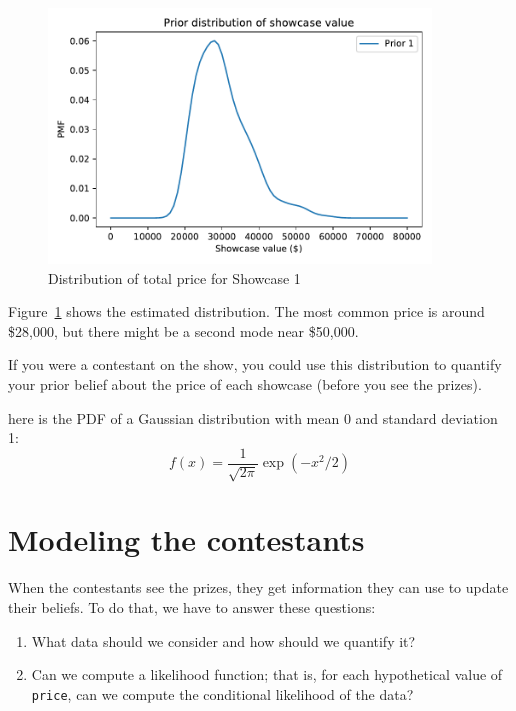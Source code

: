 \documentclass[12pt]{book}
\theoremstyle{exercise}
\newcommand{\py}[1]{{\tt #1}}%
\begin{document}
\begin{figure}
\centerline{\includegraphics[width=4in]{figs/fig08-01.pdf}}
\caption{Distribution of total price for Showcase 1}
\label{fig08-01}
\end{figure}

Figure~\ref{fig08-01} shows the estimated distribution.
The most common price is around
\$28,000, but there might be a second mode near \$50,000.

If you were a contestant on the
show, you could use this distribution to quantify your prior belief
about the price of each showcase (before you see the prizes).


here is the PDF of a Gaussian distribution with
mean 0 and standard deviation 1:
%
\[ f(x) = \frac{1}{\sqrt{2 \pi}} \exp(-x^2/2) \]
%





\section{Modeling the contestants}

When the contestants see the prizes, they get information they can use to update their beliefs.
To do that, we have to answer these questions:

\begin{enumerate}

\item What data should we consider and how should we quantify it?

\item Can we compute a likelihood function; that is,
  for each hypothetical value of \py{price}, can we compute
  the conditional likelihood of the data?

\end{enumerate}
\end{document}
